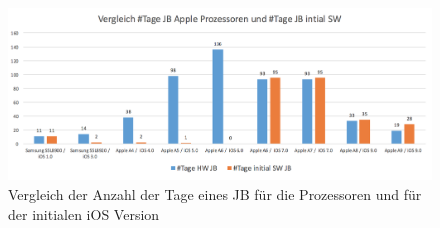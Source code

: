 \begin{figure}[htbp]
        \centering
                \includegraphics[scale=0.6]{Bilder/iDeviceJB-SW-HW.png}
         \caption{Vergleich der Anzahl der Tage eines JB für die Prozessoren und für der initialen iOS Version}
        \label{tab:VergleichJBProzessorSW}      
\end{figure}




